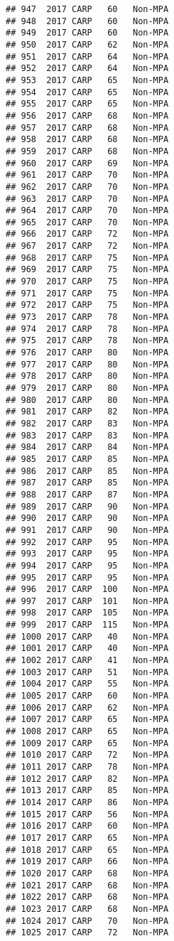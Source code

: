 \documentclass[]{article}
\begin{document}
\begin{verbatim}
## 947  2017 CARP   60   Non-MPA
## 948  2017 CARP   60   Non-MPA
## 949  2017 CARP   60   Non-MPA
## 950  2017 CARP   62   Non-MPA
## 951  2017 CARP   64   Non-MPA
## 952  2017 CARP   64   Non-MPA
## 953  2017 CARP   65   Non-MPA
## 954  2017 CARP   65   Non-MPA
## 955  2017 CARP   65   Non-MPA
## 956  2017 CARP   68   Non-MPA
## 957  2017 CARP   68   Non-MPA
## 958  2017 CARP   68   Non-MPA
## 959  2017 CARP   68   Non-MPA
## 960  2017 CARP   69   Non-MPA
## 961  2017 CARP   70   Non-MPA
## 962  2017 CARP   70   Non-MPA
## 963  2017 CARP   70   Non-MPA
## 964  2017 CARP   70   Non-MPA
## 965  2017 CARP   70   Non-MPA
## 966  2017 CARP   72   Non-MPA
## 967  2017 CARP   72   Non-MPA
## 968  2017 CARP   75   Non-MPA
## 969  2017 CARP   75   Non-MPA
## 970  2017 CARP   75   Non-MPA
## 971  2017 CARP   75   Non-MPA
## 972  2017 CARP   75   Non-MPA
## 973  2017 CARP   78   Non-MPA
## 974  2017 CARP   78   Non-MPA
## 975  2017 CARP   78   Non-MPA
## 976  2017 CARP   80   Non-MPA
## 977  2017 CARP   80   Non-MPA
## 978  2017 CARP   80   Non-MPA
## 979  2017 CARP   80   Non-MPA
## 980  2017 CARP   80   Non-MPA
## 981  2017 CARP   82   Non-MPA
## 982  2017 CARP   83   Non-MPA
## 983  2017 CARP   83   Non-MPA
## 984  2017 CARP   84   Non-MPA
## 985  2017 CARP   85   Non-MPA
## 986  2017 CARP   85   Non-MPA
## 987  2017 CARP   85   Non-MPA
## 988  2017 CARP   87   Non-MPA
## 989  2017 CARP   90   Non-MPA
## 990  2017 CARP   90   Non-MPA
## 991  2017 CARP   90   Non-MPA
## 992  2017 CARP   95   Non-MPA
## 993  2017 CARP   95   Non-MPA
## 994  2017 CARP   95   Non-MPA
## 995  2017 CARP   95   Non-MPA
## 996  2017 CARP  100   Non-MPA
## 997  2017 CARP  101   Non-MPA
## 998  2017 CARP  105   Non-MPA
## 999  2017 CARP  115   Non-MPA
## 1000 2017 CARP   40   Non-MPA
## 1001 2017 CARP   40   Non-MPA
## 1002 2017 CARP   41   Non-MPA
## 1003 2017 CARP   51   Non-MPA
## 1004 2017 CARP   55   Non-MPA
## 1005 2017 CARP   60   Non-MPA
## 1006 2017 CARP   62   Non-MPA
## 1007 2017 CARP   65   Non-MPA
## 1008 2017 CARP   65   Non-MPA
## 1009 2017 CARP   65   Non-MPA
## 1010 2017 CARP   72   Non-MPA
## 1011 2017 CARP   78   Non-MPA
## 1012 2017 CARP   82   Non-MPA
## 1013 2017 CARP   85   Non-MPA
## 1014 2017 CARP   86   Non-MPA
## 1015 2017 CARP   56   Non-MPA
## 1016 2017 CARP   60   Non-MPA
## 1017 2017 CARP   65   Non-MPA
## 1018 2017 CARP   65   Non-MPA
## 1019 2017 CARP   66   Non-MPA
## 1020 2017 CARP   68   Non-MPA
## 1021 2017 CARP   68   Non-MPA
## 1022 2017 CARP   68   Non-MPA
## 1023 2017 CARP   68   Non-MPA
## 1024 2017 CARP   70   Non-MPA
## 1025 2017 CARP   72   Non-MPA

\end{verbatim}
\end{document}
